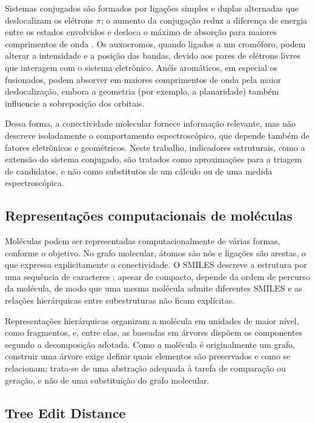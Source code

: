 Sistemas conjugados são formados por ligações simples e duplas alternadas que deslocalizam os elétrons $\pi$; o aumento da conjugação reduz a diferença de energia entre os estados envolvidos e desloca o máximo de absorção para maiores comprimentos de onda \cite{pavia_2015,skoog_2017}. Os auxocromos, quando ligados a um cromóforo, podem alterar a intensidade e a posição das bandas, devido aos pares de elétrons livres que interagem com o sistema eletrônico. Anéis aromáticos, em especial os fusionados, podem absorver em maiores comprimentos de onda pela maior deslocalização, embora a geometria (por exemplo, a planaridade) também influencie a sobreposição dos orbitais.

Dessa forma, a conectividade molecular fornece informação relevante, mas não descreve isoladamente o comportamento espectroscópico, que depende também de fatores eletrônicos e geométricos. Neste trabalho, indicadores estruturais, como a extensão do sistema conjugado, são tratados como aproximações para a triagem de candidatos, e não como substitutos de um cálculo ou de uma medida espectroscópica.

\subsection{Representações computacionais de moléculas}
\label{sec:representacoes}

Moléculas podem ser representadas computacionalmente de várias formas, conforme o objetivo. No grafo molecular, átomos são nós e ligações são arestas, o que expressa explicitamente a conectividade. O SMILES descreve a estrutura por uma sequência de caracteres \cite{weininger_1988}; apesar de compacto, depende da ordem de percurso da molécula, de modo que uma mesma molécula admite diferentes SMILES e as relações hierárquicas entre subestruturas não ficam explícitas.

Representações hierárquicas organizam a molécula em unidades de maior nível, como fragmentos, e, entre elas, as baseadas em árvores dispõem os componentes segundo a decomposição adotada. Como a molécula é originalmente um grafo, construir uma árvore exige definir quais elementos são preservados e como se relacionam; trata-se de uma abstração adequada à tarefa de comparação ou geração, e não de uma substituição do grafo molecular.

\subsection{Tree Edit Distance}
\label{sec:ted}

